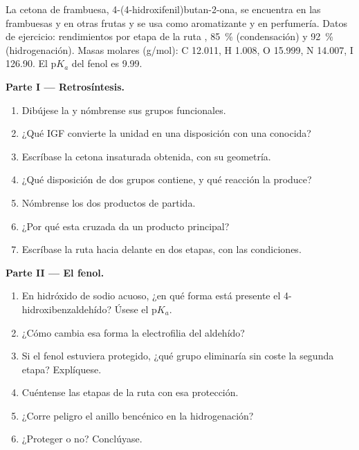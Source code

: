 \begin{problem}
\label{pb:b2:retrosynthesis:1}
La cetona de frambuesa, 4-(4-hidroxifenil)butan-2-ona, se encuentra en las frambuesas y en otras frutas y se usa
como aromatizante y en perfumería. Datos de ejercicio: rendimientos por etapa de la ruta , 85~\% (condensación)
y 92~\% (hidrogenación). Masas molares (\unit{g/mol}): C 12.011, H 1.008, O 15.999, N 14.007,
I 126.90. El $\mathrm pK_a$ del fenol es 9.99.

\medskip
\noindent\textbf{Parte I --- Retrosíntesis.}
\begin{enumerate}
  \item Dibújese la  y nómbrense sus grupos funcionales.
  \item ¿Qué IGF convierte la unidad  en una disposición con una  conocida?
  \item Escríbase la cetona insaturada obtenida, con su geometría.
  \item ¿Qué disposición de dos grupos contiene, y qué reacción la produce?
  \item Nómbrense los dos productos de partida.
  \item ¿Por qué esta  cruzada da un producto principal?
  \item Escríbase la ruta hacia delante en dos etapas, con las condiciones.
\end{enumerate}

\medskip
\noindent\textbf{Parte II --- El fenol.}
\begin{enumerate}[resume]
  \item En hidróxido de sodio acuoso, ¿en qué forma está presente el 4-hidroxibenzaldehído? Úsese el
        $\mathrm pK_a$.
  \item ¿Cómo cambia esa forma la electrofilia del aldehído?
  \item Si el fenol estuviera protegido, ¿qué grupo eliminaría sin coste la segunda etapa? Explíquese.
  \item Cuéntense las etapas de la ruta con esa protección.
  \item ¿Corre peligro el anillo bencénico en la hidrogenación?
  \item ¿Proteger o no? Conclúyase.
\end{enumerate}


\end{problem}
